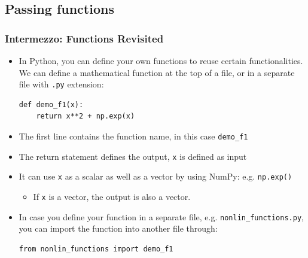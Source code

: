 \subsection{Passing functions}
\begin{frame}[fragile]
  \frametitle{Intermezzo: Functions Revisited}

  \begin{itemize}
    \item In Python, you can define your own functions to reuse certain functionalities. We can define a mathematical function at the top of a file, or in a separate file with \lstinline|.py| extension:
          \begin{lstlisting}
def demo_f1(x):
    return x**2 + np.exp(x)
      \end{lstlisting}
    \item The first line contains the function name, in this case \lstinline|demo_f1|
    \item The return statement defines the output, \lstinline|x| is defined as input
    \item It can use \lstinline|x| as a scalar as well as a vector by using NumPy: e.g. \lstinline|np.exp()|
    \begin{itemize}
      \item If \lstinline|x| is a vector, the output is also a vector.
    \end{itemize}
    \item In case you define your function in a separate file, e.g. \lstinline|nonlin_functions.py|, you can import the function into another file through:
    \begin{lstlisting}
from nonlin_functions import demo_f1
    \end{lstlisting}
  \end{itemize}
\end{frame}



